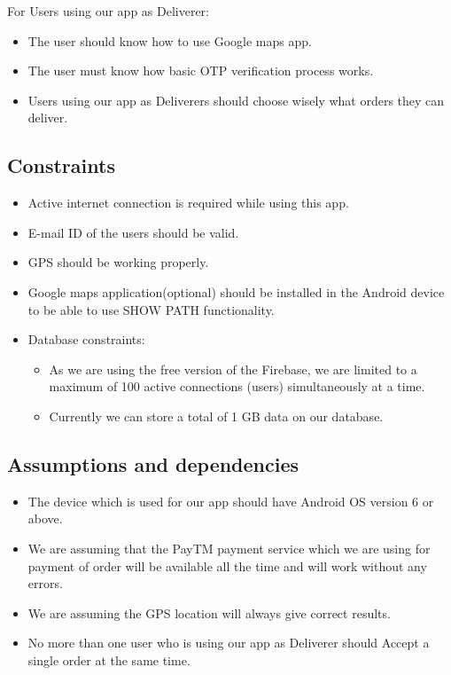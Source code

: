 \documentclass{report}
\begin{document}
For Users using our app as Deliverer:
\begin{itemize}[label=$\diamond$]
\item The user should know how to use Google maps app.
\item The user must know how basic OTP verification process works.
\item Users using our app as Deliverers should choose wisely what orders they can deliver.
\end{itemize}

\subsection{Constraints}
\begin{itemize}
\item Active internet connection is required while using this app.
\item E-mail ID of the users should be valid.
\item GPS should be working properly.
\item Google maps application(optional) should be installed in the Android device to be able to use SHOW PATH functionality.
\item Database constraints:
\begin{itemize}
\item As we are using the free version of the Firebase, we are limited to a maximum of 100 active connections (users) simultaneously at a time.
\item Currently we can store a total of 1 GB data on our database.
\end{itemize}
\end{itemize}

\subsection{Assumptions and dependencies}

\begin{itemize}
\item The device which is used for our app should have Android OS version 6 or above. 
\item We are assuming that the PayTM payment service which we are using for payment of order will be available all the time and will work without any errors.
\item We are assuming the GPS location will always give correct results.
\item No more than one user who is using our app as Deliverer should Accept a single order at the same time.
\end{itemize}
\end{document}

